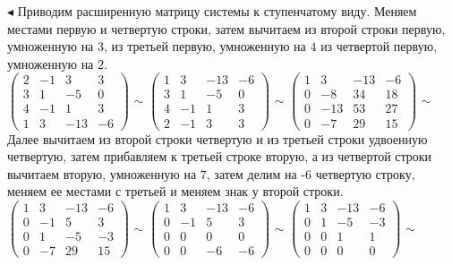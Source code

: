 \documentclass[a5paper,10pt]{article}
\begin{document}
\medskip
\noindent
$\blacktriangleleft$ Приводим расширенную матрицу системы к ступенчатому виду. Меняем местами первую и четвертую строки, затем вычитаем из второй строки первую, умноженную на $3$, из третьей первую, умноженную на $4$ из четвертой первую, умноженную на $2$.\\[3pt]
$\left(\begin{array}{rrr|r}
2& -1& 3& 3\\
3& 1& -5& 0\\
4& -1& 1& 3\\
1& 3& -13& -6
\end{array}\right)$
$\sim$
$\left(\begin{array}{rrr|r}
1& 3& -13& -6\\
3& 1& -5& 0\\
4& -1& 1& 3\\
2& -1& 3& 3
\end{array}\right)$
$\sim$
$\left(\begin{array}{rrr|r}
1& 3& -13& -6\\
0& -8& 34& 18\\
0& -13& 53& 27\\
0& -7& 29& 15
\end{array}\right)$
$\sim$\\[3pt]
Далее вычитаем из второй строки четвертую и из третьей строки удвоенную четвертую, затем прибавляем к третьей строке вторую, а из четвертой строки вычитаем вторую, умноженную на $7$, затем делим на -6 четвертую строку, меняем ее местами с третьей и меняем знак у второй строки.\\[3pt]
$\left(\begin{array}{rrr|r}
1& 3& -13& -6\\
0& -1& 5& 3\\
0& 1& -5& -3\\
0& -7& 29& 15
\end{array}\right)$
$\sim$
$\left(\begin{array}{rrr|r}
1& 3& -13& -6\\
0& -1& 5& 3\\
0& 0& 0& 0\\
0& 0& -6& -6
\end{array}\right)$
$\sim$
$\left(\begin{array}{rrr|r}
1& 3& -13& -6\\
0& 1& -5& -3\\
0& 0& 1& 1\\
0& 0& 0& 0
\end{array}\right)$
$\sim$\\[3pt]
\end{document}
